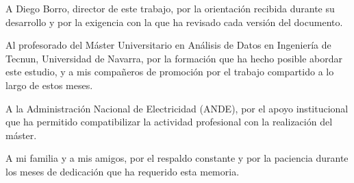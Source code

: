 
A Diego Borro, director de este trabajo, por la orientaci\'on recibida durante su
desarrollo y por la exigencia con la que ha revisado cada versi\'on del documento.

Al profesorado del M\'aster Universitario en An\'alisis de Datos en Ingenier\'ia de
Tecnun, Universidad de Navarra, por la formaci\'on que ha hecho posible abordar este
estudio, y a mis compa\~neros de promoci\'on por el trabajo compartido a lo largo de estos
meses.

A la Administraci\'on Nacional de Electricidad (ANDE), por el apoyo institucional que ha
permitido compatibilizar la actividad profesional con la realizaci\'on del m\'aster.

A mi familia y a mis amigos, por el respaldo constante y por la paciencia durante los
meses de dedicaci\'on que ha requerido esta memoria.
